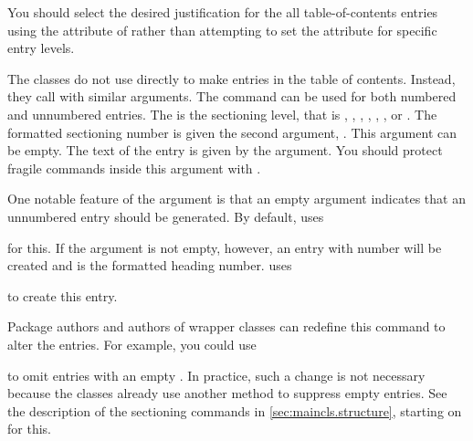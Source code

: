 You should select the desired justification for the all table-of-contents
entries using the  attribute of 
rather than attempting to set the attribute for specific entry levels.%
\EndIndexGroup


\begin{Declaration}
\end{Declaration}
The \KOMAScript{} classes do not use
%
 directly to make entries in the table of
contents. Instead, they call  with similar
arguments. The command can be used for both numbered and unnumbered entries.
The  is the sectioning level, that is ,
, , ,
, , or . The
formatted sectioning number is given the second argument, . This
argument can be empty. The text of the entry is given by the 
argument. You should protect fragile commands inside this argument with
.

One notable feature of the  argument is that an empty argument
indicates that an unnumbered entry should be generated. By default,
\KOMAScript{} uses
\begin{quote}
\end{quote}
for this. If the argument is not empty, however, an entry with number
will be created and  is the formatted heading
number. \KOMAScript{} uses
\begin{quote}\raggedright
\end{quote}
to create this entry.

Package authors and authors of wrapper classes can redefine this command to
alter the entries. For example, you could use
\begin{lstcode}
  \renewcommand{\addtocentrydefault}[3]{%
    \IfArgIsEmpty{#3}{%
      \IfArgIsEmpty{#2}{%
        \addcontentsline{toc}{#1}{#3}%
      }{%
        \addcontentsline{toc}{#1}{\protect\numberline{#2}#3}%
      }%
    }%
  }%
\end{lstcode}
to omit entries with an empty . In
practice, such a change is not necessary because the \KOMAScript{} classes
already use another method to suppress empty entries. See the description of
the sectioning commands in \autoref{sec:maincls.structure}, starting on
 for this.%
%
\EndIndexGroup


